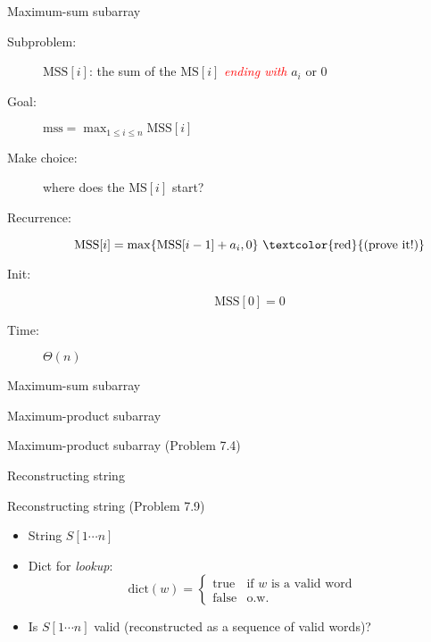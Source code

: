 \begin{frame}{Maximum-sum subarray}
  \begin{description}
	\item[Subproblem:] $\text{MSS}[i]$: the sum of the $\text{MS}[i]$ \textcolor{red}{\it ending with} $a_{i}$ or 0
	\item[Goal:] $\text{mss} = \max_{1 \le i \le n} \text{MSS}[i]$
	\pause
	\item[Make choice:] where does the $\text{MS}[i]$ start?
	\item[Recurrence:]
	  \[ 
		\text{MSS}[i] = \max \set{\text{MSS}[i-1] + a_{i}, 0} \text{ \textcolor{red}{(prove it!)}}
	  \]
	\pause
	\item[Init:]
	  \[
		\text{MSS}[0] = 0
	  \]
	  \pause
	\item[Time:] $\Theta(n)$
  \end{description}
\end{frame}
\begin{frame}{Maximum-sum subarray}
%
\end{frame}
\begin{frame}{Maximum-product subarray}
  \begin{exampleblock}{Maximum-product subarray (Problem 7.4)}
  \end{exampleblock}
\end{frame}
\begin{frame}{Reconstructing string}
  \begin{exampleblock}{Reconstructing string (Problem 7.9)}
    \begin{itemize}
      \item String $S[1 \cdots n]$
      \item Dict for \emph{lookup}:
		\begin{displaymath}
		  \text{dict}(w) = \left\{ \begin{array}{ll}
			\text{true} & \textrm{if } w \textrm{ is a valid word}\\
			\text{false} & \textrm{o.w.}
		  \end{array} \right.
		\end{displaymath}
	  \item Is $S[1 \cdots n]$ valid (reconstructed as a sequence of valid words)?
    \end{itemize}
  \end{exampleblock}
\end{frame}
